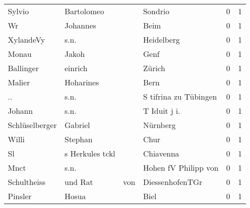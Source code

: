 \begin{tabular}{llllrr}
                   Sylvio &                         Bartolomeo &             &                                     Sondrio &          0 &         1 \\
                       Wr &                           Johannes &             &                                        Beim &          0 &         1 \\
                XylandeVy &                               s.n. &             &                                  Heidelberg &          0 &         1 \\
                    Monau &                              Jakoh &             &                                        Genf &          0 &         1 \\
                Ballinger &                            einrich &             &                                      Zürich &          0 &         1 \\
                   Malier &                          Hoharines &             &                                        Bern &          0 &         1 \\
                       .. &                               s.n. &             &                       S tifrina zu Tübingen &          0 &         1 \\
                   Johann &                               s.n. &             &                               T Iduit j i.  &          0 &         1 \\
           Schlüselberger &                            Gabriel &             &                                    Nürnberg &          0 &         1 \\
                    Willi &                            Stephan &             &                                        Chur &          0 &         1 \\
                       Sl &                    s Herkules tckl &             &                                   Chiavenna &          0 &         1 \\
                     Mnct &                               s.n. &             &                        Hohen fV Philipp von &          0 &         1 \\
              Schultheiss &                            und Rat &         von &                             DiessenhofenTGr &          0 &         1 \\
                  Pinsler &                              Hosua &             &                                        Biel &          0 &         1 \\

\end{tabular}

